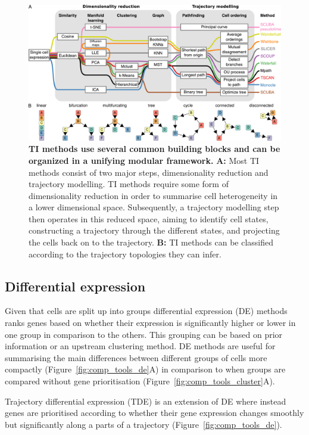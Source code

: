 \begin{figure}[htb!]
	\centering
	\includegraphics[width=.9\linewidth]{fig/ti_metro} 
	\caption{
		\textbf{TI methods use several common building blocks and can be organized in a unifying modular framework.} 
		\textbf{A:} Most TI methods consist of two major steps, dimensionality reduction and trajectory modelling. TI methods   require some form of dimensionality reduction in order to summarise cell heterogeneity in a lower dimensional space. Subsequently, a trajectory modelling step then operates in this reduced space, aiming to identify cell states, constructing a trajectory through the different states, and projecting the cells back on to the trajectory. 
		\textbf{B:} TI methods can be classified according to the trajectory topologies they can infer.
	}
	\label{fig:ti_metro}
\end{figure}


\subsection{Differential expression}
Given that cells are split up into groups differential expression (DE) methods ranks genes based on whether their expression is significantly higher or lower in one group in comparison to the others. This grouping can be based on prior information or an upstream clustering method. DE methods are useful for summarising the main differences between different groups of cells more compactly (Figure~\ref{fig:comp_tools_de}A) in comparison to when groups are compared without gene prioritisation (Figure~\ref{fig:comp_tools_cluster}A). 

Trajectory differential expression (TDE) is an extension of DE where instead genes are prioritised according to whether their gene expression changes smoothly but significantly along a parts of a trajectory (Figure~\ref{fig:comp_tools_de}). 

